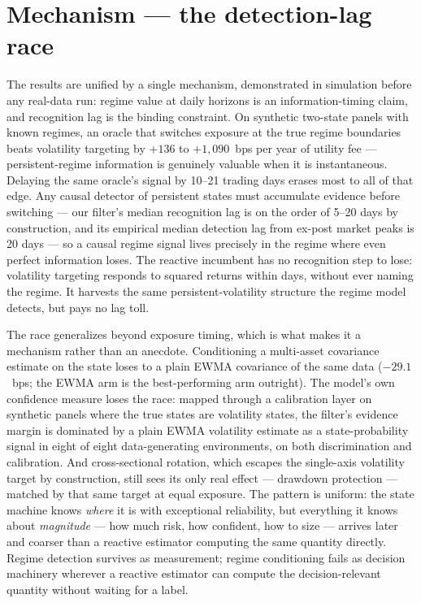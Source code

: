 \documentclass[11pt]{article}
\newcommand{\aidraft}[1]{{\color{aidraftcolor}#1}} %
\newcommand{\aidraft}[1]{#1}
\newcommand{\detLag}{20}              %
\newcommand{\feeBreact}{-29.1}
\newcommand{\dgpCells}{eight of eight}
\begin{document}
\section{Mechanism --- the detection-lag race}
\label{sec:mechanism}

\aidraft{%
The results are unified by a single mechanism, demonstrated in simulation before any real-data run:
regime value at daily horizons is an information-timing claim, and recognition lag is the binding
constraint.
On synthetic two-state panels with known regimes, an oracle that switches exposure at the true
regime boundaries beats volatility targeting by $+136$ to $+1{,}090$~bps per year of utility fee ---
persistent-regime information is genuinely valuable when it is instantaneous.
Delaying the same oracle's signal by 10--21 trading days erases most to all of that edge.
Any causal detector of persistent states must accumulate evidence before switching --- our filter's
median recognition lag is on the order of 5--20 days by construction, and its empirical median
detection lag from ex-post market peaks is \detLag{} days --- so a causal regime signal lives
precisely in the regime where even perfect information loses.
The reactive incumbent has no recognition step to lose: volatility targeting responds to squared
returns within days, without ever naming the regime.
It harvests the same persistent-volatility structure the regime model detects, but pays no lag toll.%
}

\aidraft{%
The race generalizes beyond exposure timing, which is what makes it a mechanism rather than an
anecdote.
Conditioning a multi-asset covariance estimate on the state loses to a plain EWMA covariance of the
same data ($\feeBreact$~bps; the EWMA arm is the best-performing arm outright).
The model's own confidence measure loses the race: mapped through a calibration layer on synthetic
panels where the true states are volatility states, the filter's evidence margin is dominated by a
plain EWMA volatility estimate as a state-probability signal in \dgpCells{} data-generating
environments, on both discrimination and calibration.
And cross-sectional rotation, which escapes the single-axis volatility target by construction, still
sees its only real effect --- drawdown protection --- matched by that same target at equal exposure.
The pattern is uniform: the state machine knows \emph{where} it is with exceptional reliability, but
everything it knows about \emph{magnitude} --- how much risk, how confident, how to size --- arrives
later and coarser than a reactive estimator computing the same quantity directly.
Regime detection survives as measurement; regime conditioning fails as decision machinery wherever a
reactive estimator can compute the decision-relevant quantity without waiting for a label.%
}
\end{document}

